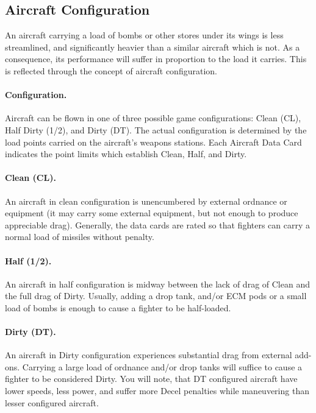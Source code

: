 \begin{advancedrules}

\section{Aircraft Configuration}
\label{rule:aircraft-configuration}

An aircraft carrying a load of bombs or other stores under its wings is less streamlined, and significantly heavier than a similar aircraft which is not. As a consequence, its performance will suffer in proportion to the load it carries. This is reflected through the concept of aircraft configuration.

\paragraph{Configuration.} 
Aircraft can be flown in one of three possible game configurations: Clean (CL), Half Dirty (1/2), and Dirty (DT). The actual configuration is determined by the  load points carried on the aircraft's weapons stations.  Each Aircraft Data Card indicates the point limits which establish Clean, Half, and Dirty. 

\paragraph{Clean (CL).} 
An aircraft in clean configuration is unencumbered by external ordnance or equipment (it may carry some external equipment, but not enough to produce appreciable drag). Generally, the data cards are rated so that fighters can carry a normal load of missiles without penalty.

\paragraph{Half (1/2).} 
An aircraft in half configuration is midway between the lack of drag of Clean and the full drag of Dirty. Usually, adding a drop tank, and/or ECM pods or a small load of bombs is enough to cause a fighter to be half-loaded.

\paragraph{Dirty (DT).} 
An aircraft in Dirty configuration experiences substantial drag from external add-ons. Carrying a large load of ordnance and/or drop tanks will suffice to cause a fighter to be considered Dirty. You will note, that DT configured aircraft have lower speeds, less power, and suffer more Decel penalties while maneuvering than lesser configured aircraft.


\end{advancedrules}
